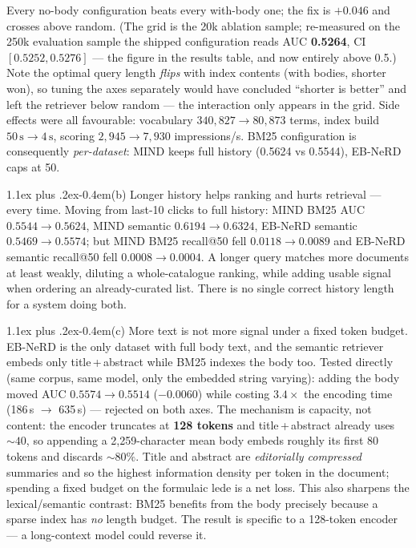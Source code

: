 \documentclass[10pt,a4paper]{article}
\makeatletter
\renewcommand\subsection{\@startsection{subsection}{2}{0pt}%
  {1.1ex plus .2ex}{-0.4em}{\normalfont\bfseries}}
\makeatother
\begin{document}
Every no-body configuration beats every with-body one; the fix is $+0.046$ and crosses
above random. (The grid is the 20k ablation sample; re-measured on the 250k evaluation
sample the shipped configuration reads AUC \textbf{0.5264}, CI $[0.5252, 0.5276]$ --- the
figure in the results table, and now entirely above 0.5.) Note the optimal query length \emph{flips} with index contents (with bodies,
shorter won), so tuning the axes separately would have concluded ``shorter is better'' and
left the retriever below random --- the interaction only appears in the grid. Side effects
were all favourable: vocabulary $340{,}827 \rightarrow 80{,}873$ terms, index build
$50\,\mathrm{s} \rightarrow 4\,\mathrm{s}$, scoring $2{,}945 \rightarrow 7{,}930$
impressions/s. BM25 configuration is consequently \emph{per-dataset}: MIND keeps full
history (0.5624 vs 0.5544), EB-NeRD caps at 50.

\subsection{(b) Longer history helps ranking and hurts retrieval --- every time.}
Moving from last-10 clicks to full history: MIND BM25 AUC $0.5544\!\rightarrow\!0.5624$,
MIND semantic $0.6194\!\rightarrow\!0.6324$, EB-NeRD semantic
$0.5469\!\rightarrow\!0.5574$; but MIND BM25 recall@50 fell $0.0118\!\rightarrow\!0.0089$
and EB-NeRD semantic recall@50 fell $0.0008\!\rightarrow\!0.0004$. A longer query matches
more documents at least weakly, diluting a whole-catalogue ranking, while adding usable
signal when ordering an already-curated list. There is no single correct history length for
a system doing both.

\subsection{(c) More text is not more signal under a fixed token budget.}
EB-NeRD is the only dataset with full body text, and the semantic retriever embeds only
title\,+\,abstract while BM25 indexes the body too. Tested directly (same corpus, same
model, only the embedded string varying): adding the body moved AUC
$0.5574 \rightarrow 0.5514$ ($-0.0060$) while costing $3.4\times$ the encoding time
(186\,s $\rightarrow$ 635\,s) --- rejected on both axes. The mechanism is capacity, not
content: the encoder truncates at \textbf{128 tokens} and title\,+\,abstract already uses
${\sim}40$, so appending a 2{,}259-character mean body embeds roughly its first 80 tokens
and discards ${\sim}80\%$. Title and abstract are \emph{editorially compressed} summaries
and so the highest information density per token in the document; spending a fixed budget
on the formulaic lede is a net loss. This also sharpens the lexical/semantic contrast:
BM25 benefits from the body precisely because a sparse index has \emph{no} length budget.
The result is specific to a 128-token encoder --- a long-context model could reverse it.
\end{document}
